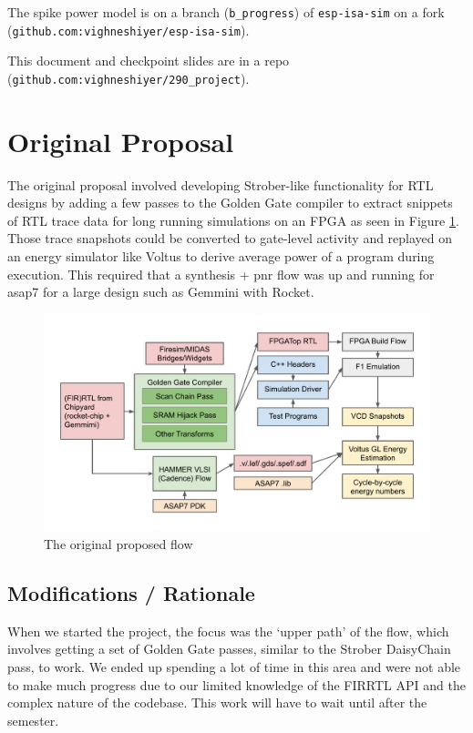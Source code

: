 \documentclass[sigconf]{acmart}
\begin{document}
The spike power model is on a branch (\texttt{b\_progress}) of \texttt{esp-isa-sim} on a fork (\texttt{github.com:vighneshiyer/esp-isa-sim}).

This document and checkpoint slides are in a repo\\
(\texttt{github.com:vighneshiyer/290\_project}).


\section{Original Proposal}
The original proposal involved developing Strober\cite{strober}-like functionality for RTL designs by adding a few passes to the Golden Gate compiler to extract snippets of RTL trace data for long running simulations on an FPGA as seen in Figure \ref{fig:original_proposal}.
Those trace snapshots could be converted to gate-level activity and replayed on an energy simulator like Voltus to derive average power of a program during execution.
This required that a synthesis + pnr flow was up and running for asap7 for a large design such as Gemmini with Rocket.

\begin{figure}
  \centering
  \includegraphics[width=\linewidth]{original_proposal.pdf}
  \caption{The original proposed flow}
  \label{fig:original_proposal}
\end{figure}

\subsection{Modifications / Rationale}
When we started the project, the focus was the `upper path' of the flow, which involves getting a set of Golden Gate passes, similar to the Strober DaisyChain pass, to work.
We ended up spending a lot of time in this area and were not able to make much progress due to our limited knowledge of the FIRRTL API and the complex nature of the codebase.
This work will have to wait until after the semester.
\end{document}
